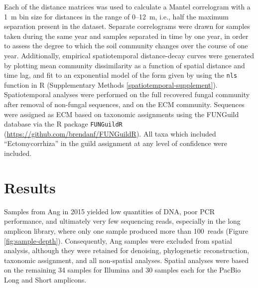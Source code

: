 \documentclass[
  12pt,
]{article}
\begin{document}
Each of the distance matrices was used to calculate a Mantel correlogram with a 1~m bin size for distances in the range of 0--12~m, i.e., half the maximum separation present in the dataset.
Separate correlograms were drawn for samples taken during the same year and samples separated in time by one year, in order to assess the degree to which the soil community changes over the course of one year.
Additionally, empirical spatiotemporal distance-decay curves were generated by plotting mean community dissimilarity as a function of spatial distance and time lag, and fit to an exponential model of the form given by \textcite{legendre2012} using the \texttt{nls} function in R (Supplementary Methods \ref{spatiotemporal-supplement}).
Spatiotemporal analyses were performed on the full recovered fungal community after removal of non-fungal sequences, and on the ECM community.
Sequences were assigned as ECM based on taxonomic assignments using the FUNGuild database \autocite[as of 20 Feb, 2020;][]{nguyen2016funguild} via the R package \texttt{FUNGuildR} (\url{https://github.com/brendanf/FUNGuildR}).
All taxa which included ``Ectomycorrhiza'' in the guild assignment at any level of confidence were included.

\hypertarget{results}{%
\section{Results}\label{results}}

Samples from Ang in 2015 yielded low quantities of DNA, poor PCR performance, and ultimately very few sequencing reads, especially in the long amplicon library, where only one sample produced more than 100~reads (Figure \ref{fig:sample-depth}).
Consequently, Ang samples were excluded from spatial analysis, although they were retained for denoising, phylogenetic reconstruction, taxonomic assignment, and all non-spatial analyses.
Spatial analyses were based on the remaining 34 samples for Illumina and 30 samples each for the PacBio Long and Short amplicons.
\end{document}
